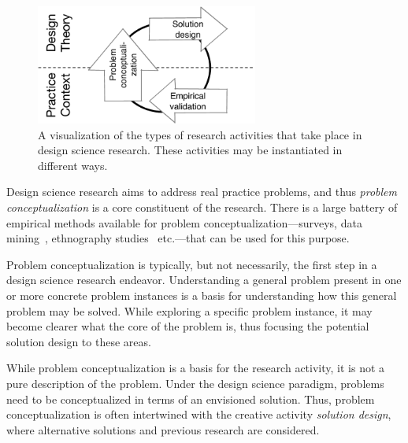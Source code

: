 \documentclass[graybox]{svmult}
\begin{document}
\begin{figure}[t]
\centering
 \includegraphics[width=0.65\textwidth]{Figures/DSSE_process.pdf}
\caption{A visualization of the types of research activities that take place in design science research. These activities may be instantiated in different ways.}
\label{fig:DS_process}       %
\end{figure}

Design science research aims to address real practice problems, and thus \emph{problem conceptualization} is a core constituent of the research. There is a large battery of empirical methods available for problem conceptualization---surveys, data mining~\cite{MenziesDataMining2016}, ethnography studies~\cite{SharpEthnography2016} etc.---that can be used for this purpose. 

Problem conceptualization is typically, but not necessarily, the first step in a design science research endeavor. Understanding a general problem present in one or more concrete problem instances is a basis for understanding how this general problem may be solved. While exploring a specific problem instance, it may become clearer what the core of the problem is, thus focusing the potential solution design to these areas. 

While problem conceptualization is a basis for the research activity, it is not a pure description of the problem. Under the design science paradigm, problems need to be conceptualized in terms of an envisioned solution. Thus, problem conceptualization is often intertwined with the creative activity \emph{solution design}, where alternative solutions and previous research are considered. 

\end{document}
